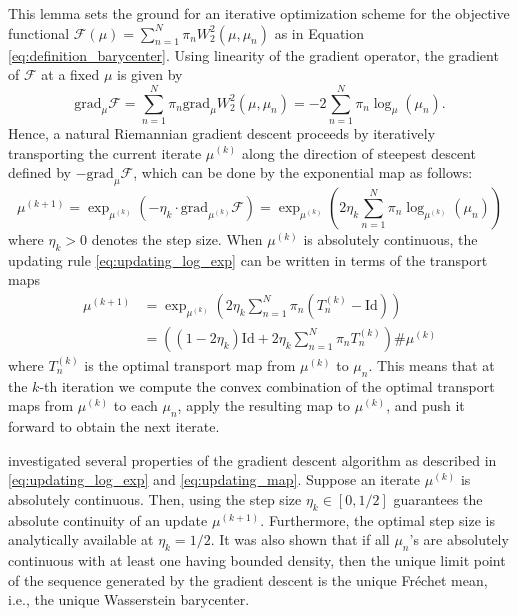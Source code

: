 \documentclass[11pt]{article}
\newcommand{\calF}{\mathcal{F}}
\newcommand{\Frechet}{Fr\'{e}chet\xspace}
\begin{document}
This lemma sets the ground for an iterative optimization scheme for the objective functional $\calF(\mu) = \sum_{n=1}^N \pi_n W_2^2(\mu, \mu_n)$ as in Equation  \eqref{eq:definition_barycenter}. Using linearity of the gradient operator, the gradient of $\calF$ at a fixed $\mu$ is given by 
\begin{equation*}
    \text{grad}_\mu\calF = \sum_{n=1}^N \pi_n   \text{grad}_\mu W_2^2(\mu, \mu_n) = -2\sum_{n=1}^N \pi_n \log_\mu (\mu_n).
\end{equation*}
Hence, a natural Riemannian gradient descent proceeds by iteratively transporting the current iterate $\mu^{(k)}$ along the direction of steepest descent defined by $-\text{grad}_\mu \calF$, which can be done by the exponential map as follows:
\begin{equation}\label{eq:updating_log_exp}
    \mu^{(k+1)} = \exp_{\mu^{(k)}}\left(-\eta_k \cdot \text{grad}_{\mu^{(k)}}\calF\right) = \exp_{\mu^{(k)}}\left(2\eta_k \sum_{n=1}^N \pi_n \log_{\mu^{(k)}}(\mu_n)\right)
\end{equation}
where $\eta_k > 0$ denotes the step size. When $\mu^{(k)}$ is absolutely continuous, the updating rule \eqref{eq:updating_log_exp} can be written in terms of the transport maps
\begin{equation}\label{eq:updating_map}
\begin{aligned}
    \mu^{(k+1)} &= \exp_{\mu^{(k)}}\left(2\eta_k \sum_{n=1}^N \pi_n (T_{n}^{(k)} -\text{Id})\right) \\
      &= \left((1-2\eta_k)\text{Id} + 2\eta_k \sum_{n=1}^N \pi_n T_n^{(k)}\right){\#} \mu^{(k)} 
\end{aligned}
\end{equation}
where $T_n^{(k)}$ is the optimal transport map from $\mu^{(k)}$ to $\mu_n$. This means that at the $k$-th iteration we compute the convex combination of the optimal transport maps from $\mu^{(k)}$ to each $\mu_n$, apply the resulting map to $\mu^{(k)}$, and push it forward to obtain the next iterate.

\cite{zemel_2019_FrechetMeansProcrustes} investigated several properties of the gradient descent algorithm as described in \eqref{eq:updating_log_exp} and \eqref{eq:updating_map}. Suppose an iterate $\mu^{(k)}$ is absolutely continuous. Then, using the step size $\eta_k \in  [0,1/2]$ guarantees the absolute continuity of an update $\mu^{(k+1)}$. Furthermore, the optimal step size is analytically available at $\eta_k = 1/2$. It was also shown that if all $\mu_n$'s are absolutely continuous with at least one having bounded density, then the unique limit point of the sequence generated by the gradient descent is the unique \Frechet mean, i.e., the unique Wasserstein barycenter. 
\end{document}
